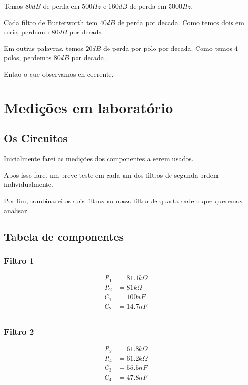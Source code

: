 \documentclass[12pt,twoside, a4paper, twocolumn]{article}
\begin{document}
Temos $80dB$ de perda em $500Hz$ e $160dB$ de perda em $5000Hz$.

Cada filtro de Butterworth tem $40dB$ de perda por decada. Como temos dois em serie, perdemos $80dB$ por decada.

Em outras palavras. temos $20dB$ de perda por polo por decada. Como temos 4 polos, perdemos $80dB$ por decada.

Entao o que observamos eh coerente.

\pagebreak

\section{Medições em laboratório}


\subsection{Os Circuitos}

Inicialmente farei as medições dos componentes a serem usados.

Apos isso farei um breve teste em cada um dos filtros de segunda ordem individualmente.

Por fim, combinarei os dois filtros no nosso filtro de quarta  ordem que queremos analisar.

\subsection{Tabela de componentes}

\subsubsection*{Filtro 1}
\begin{equation}
    \begin{aligned}
        R_1 & = 81.1k \varOmega \\
        R_2 & = 81k \varOmega   \\
        C_1 & = 100 nF          \\
        C_2 & = 14.7 nF         \\
    \end{aligned}
\end{equation}

\subsubsection*{Filtro 2}
\begin{equation}
    \begin{aligned}
        R_3 & = 61.8k \varOmega \\
        R_4 & = 61.2k \varOmega \\
        C_3 & = 55.5 nF         \\
        C_4 & = 47.8 nF         \\
    \end{aligned}
\end{equation}
\end{document}
